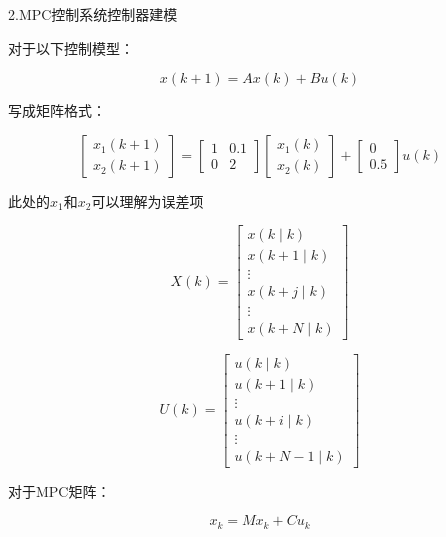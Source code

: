 2.MPC控制系统控制器建模

对于以下控制模型：

\begin{equation}
x(k+1)=A x(k)+B u(k)
\end{equation}

写成矩阵格式：

\begin{equation}
\left[\begin{array}{l}x_{1}(k+1) \\x_{2}(k+1)\end{array}\right]=\left[\begin{array}{cc}1 & 0.1 \\0 & 2\end{array}\right]\left[\begin{array}{l}x_{1}(k) \\x_{2}(k)\end{array}\right]+\left[\begin{array}{c}0 \\0.5\end{array}\right] u(k)
\end{equation}

此处的$x_{1}$和$x_{2}$可以理解为误差项

\begin{equation}
X(k)=\left[\begin{array}{c}x(k \mid k) \\x(k+1 \mid k) \\\vdots\\ x(k+j \mid k)\\\vdots \\x(k+N \mid k)\end{array}\right]
\end{equation}

\begin{equation}
U(k)=\left[\begin{array}{c}u(k \mid k) \\u(k+1 \mid k) \\\vdots\\ u(k+i \mid k)\\\vdots \\u(k+N-1 \mid k)\end{array}\right]
\end{equation}

对于MPC矩阵：

\begin{equation}
x_{k}=M x_{k}+C u_{k}
\end{equation}


